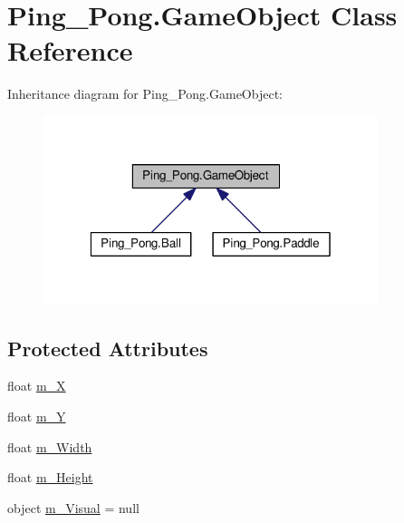 \hypertarget{class_ping___pong_1_1_game_object}{\section{Ping\-\_\-\-Pong.\-Game\-Object Class Reference}
\label{class_ping___pong_1_1_game_object}
}


Inheritance diagram for Ping\-\_\-\-Pong.\-Game\-Object\-:\nopagebreak
\begin{figure}[H]
\begin{center}
\leavevmode
\includegraphics[width=277pt]{class_ping___pong_1_1_game_object__inherit__graph}
\end{center}
\end{figure}
\subsection*{Protected Attributes}
\begin{DoxyCompactItemize}
\item 
float \hyperlink{class_ping___pong_1_1_game_object_a292627bfcfe03c2f5a1dc403faa37690}{m\-\_\-\-X}
\item 
float \hyperlink{class_ping___pong_1_1_game_object_a29466cb57b6ac26e58052b2517083745}{m\-\_\-\-Y}
\item 
float \hyperlink{class_ping___pong_1_1_game_object_ac75ebfdec034a75ed71dbf91eface23f}{m\-\_\-\-Width}
\item 
float \hyperlink{class_ping___pong_1_1_game_object_a22de23272c1b02fb7bf7b13da7804afb}{m\-\_\-\-Height}
\item 
object \hyperlink{class_ping___pong_1_1_game_object_a5009be35d8fba10d72173a954caef57c}{m\-\_\-\-Visual} = null
\end{DoxyCompactItemize}

